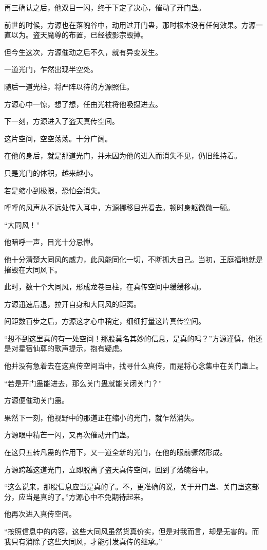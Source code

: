 \begin{this_body}
再三确认之后，他双目一闪，终于下定了决心，催动了开门蛊。

前世的时候，方源也在落魄谷中，动用过开门蛊，那时根本没有任何效果。方源一直以为。盗天魔尊的布置，已经被影宗毁掉。

但今生这次，方源催动之后不久，就有异变发生。

一道光门，乍然出现半空处。

随后一道光柱，将严阵以待的方源照住。

方源心中一惊，想了想，任由光柱将他吸摄进去。

下一刻，方源进入了盗天真传空间。

这片空间，空空荡荡。十分广阔。

在他的身后，就是那道光门，并未因为他的进入而消失不见，仍旧维持着。

只是光门的体积，越来越小。

若是缩小到极限，恐怕会消失。

呼呼的风声从不远处传入耳中，方源挪移目光看去。顿时身躯微微一颤。

“大同风！”

他暗呼一声，目光十分忌惮。

他十分清楚大同风的威力，此风能同化一切，不断抓大自己。当初，王庭福地就是摧毁在大同风下。

此时，数十个大同风，形成龙卷巨柱，在真传空间中缓缓移动。

方源迅速后退，拉开自身和大同风的距离。

间距数百步之后，方源这才心中稍定，细细打量这片真传空间。

“想不到这里真的有一处空间！那股莫名其妙的信息，是真的吗？”方源谨慎，他还是对星宿仙尊的歌声提示，抱有疑虑。

他并没有急着去在这真传空间当中，找寻什么真传，而是将心念集中在关门蛊上。

“若是开门蛊能进去，那么关门蛊就能关闭关门？”

方源便催动关门蛊。

果然下一刻，他视野中的那道正在缩小的光门，就乍然消失。

方源眼中精芒一闪，又再次催动开门蛊。

在这只五转凡蛊的作用下，又一道全新的光门，在他的眼前骤然形成。

方源跨越这道光门，立即脱离了盗天真传空间，回到了落魄谷中。

“这么说来，那股信息应当是真的了。不，更准确的说，关于开门蛊、关门蛊这部分，应当是真的了。”方源心中不免期待起来。

他再次进入真传空间。

“按照信息中的内容，这些大同风虽然货真价实，但是对我而言，却是无害的。而我只有消除了这些大同风，才能引发真传的继承。”


\end{this_body}

